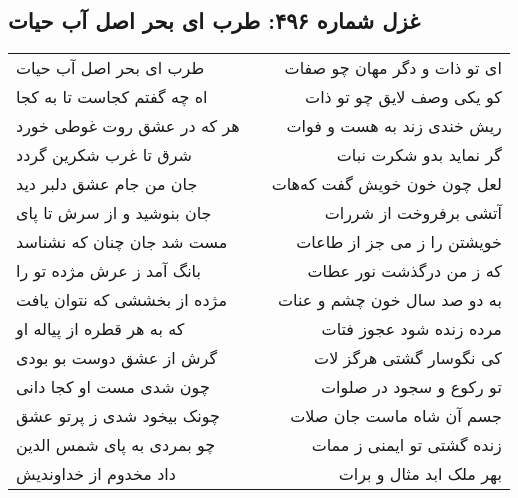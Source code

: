 \begin{center}
\section*{غزل شماره ۴۹۶: طرب ای بحر اصل آب حیات}
\label{sec:0496}
\begin{longtable}{l p{0.5cm} r}
طرب ای بحر اصل آب حیات
&&
ای تو ذات و دگر مهان چو صفات
\\
اه چه گفتم کجاست تا به کجا
&&
کو یکی وصف لایق چو تو ذات
\\
هر که در عشق روت غوطی خورد
&&
ریش خندی زند به هست و فوات
\\
شرق تا غرب شکرین گردد
&&
گر نماید بدو شکرت نبات
\\
جان من جام عشق دلبر دید
&&
لعل چون خون خویش گفت که‌هات
\\
جان بنوشید و از سرش تا پای
&&
آتشی برفروخت از شررات
\\
مست شد جان چنان که نشناسد
&&
خویشتن را ز می جز از طاعات
\\
بانگ آمد ز عرش مژده تو را
&&
که ز من درگذشت نور عطات
\\
مژده از بخششی که نتوان یافت
&&
به دو صد سال خون چشم و عنات
\\
که به هر قطره از پیاله او
&&
مرده زنده شود عجوز فتات
\\
گرش از عشق دوست بو بودی
&&
کی نگوسار گشتی هرگز لات
\\
چون شدی مست او کجا دانی
&&
تو رکوع و سجود در صلوات
\\
چونک بیخود شدی ز پرتو عشق
&&
جسم آن شاه ماست جان صلات
\\
چو بمردی به پای شمس الدین
&&
زنده گشتی تو ایمنی ز ممات
\\
داد مخدوم از خداوندیش
&&
بهر ملک ابد مثال و برات
\\
\end{longtable}
\end{center}

